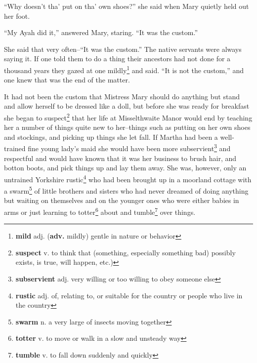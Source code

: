 ``Why doesn't tha' put on tha' own shoes?'' she said when Mary quietly held out her foot.

``My Ayah did it,'' answered Mary, staring. ``It was the custom.''

She said that very often--``It was the custom.'' The native servants were always saying it. If one told them to do a thing their ancestors had not done for a thousand years they gazed at one mildly\footnote{\textbf{mild} adj. (\textbf{adv.} mildly) gentle in nature or behavior} and said. ``It is not the custom,'' and one knew that was the end of the matter.

It had not been the custom that Mistress Mary should do anything but stand and allow herself to be dressed like a doll, but before she was ready for breakfast she began to suspect\footnote{\textbf{suspect} v. to think that (something, especially something bad) possibly exists, is true, will happen, etc.)} that her life at Misselthwaite Manor would end by teaching her a number of things quite new to her--things such as putting on her own shoes and stockings, and picking up things she let fall. If Martha had been a well-trained fine young lady's maid she would have been more subservient\footnote{\textbf{subservient} adj. very willing or too willing to obey someone else} and respectful and would have known that it was her business to brush hair, and botton boots, and pick things up and lay them away. She was, however, only an untrained Yorkshire rustic\footnote{\textbf{rustic} adj. of, relating to, or suitable for the country or people who live in the country} who had been brought up in a moorland cottage with a swarm\footnote{\textbf{swarm} n. a very large of insects moving together} of little brothers and sisters who had never dreamed of doing anything but waiting on themselves and on the younger ones who were either babies in arms or just learning to totter\footnote{\textbf{totter} v. to move or walk in a slow and unsteady way} about and tumble\footnote{\textbf{tumble} v. to fall down suddenly and quickly} over things.
